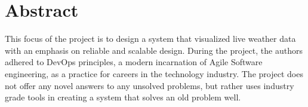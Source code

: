 \section{Abstract}
This focus of the project is to design a system that visualized live weather data with an emphasis on reliable and scalable design. 
During the project, the authors adhered to DevOps principles, a modern incarnation of Agile Software engineering, as a practice for careers in the technology industry.
The project does not offer any novel answers to any unsolved problems, but rather uses industry grade tools in creating a system that solves an old problem well.